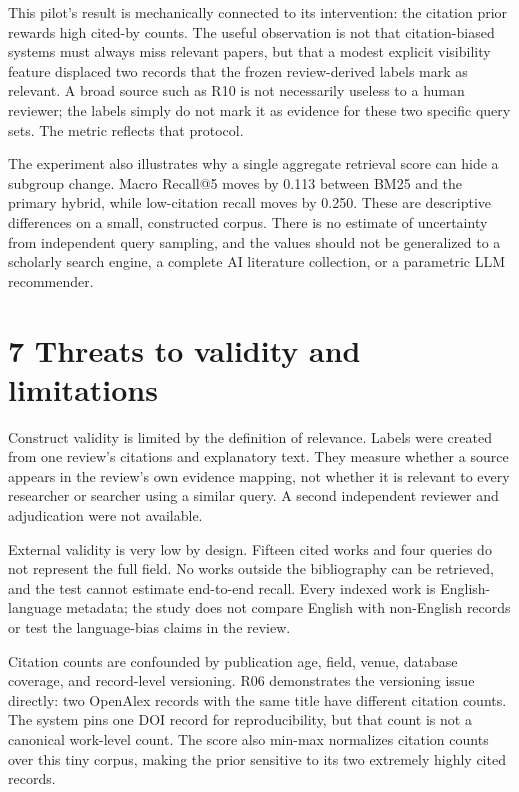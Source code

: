 \documentclass[acmsmall,nonacm]{acmart}
\begin{document}
This pilot's result is mechanically connected to its intervention: the citation prior rewards high cited-by counts. The useful observation is not that citation-biased systems must always miss relevant papers, but that a modest explicit visibility feature displaced two records that the frozen review-derived labels mark as relevant. A broad source such as R10 is not necessarily useless to a human reviewer; the labels simply do not mark it as evidence for these two specific query sets. The metric reflects that protocol.\par

The experiment also illustrates why a single aggregate retrieval score can hide a subgroup change. Macro Recall@5 moves by 0.113 between BM25 and the primary hybrid, while low-citation recall moves by 0.250. These are descriptive differences on a small, constructed corpus. There is no estimate of uncertainty from independent query sampling, and the values should not be generalized to a scholarly search engine, a complete AI literature collection, or a parametric LLM recommender.\par

\section*{7 Threats to validity and limitations}

Construct validity is limited by the definition of relevance. Labels were created from one review's citations and explanatory text. They measure whether a source appears in the review's own evidence mapping, not whether it is relevant to every researcher or searcher using a similar query. A second independent reviewer and adjudication were not available.\par

External validity is very low by design. Fifteen cited works and four queries do not represent the full field. No works outside the bibliography can be retrieved, and the test cannot estimate end-to-end recall. Every indexed work is English-language metadata; the study does not compare English with non-English records or test the language-bias claims in the review.\par

Citation counts are confounded by publication age, field, venue, database coverage, and record-level versioning. R06 demonstrates the versioning issue directly: two OpenAlex records with the same title have different citation counts. The system pins one DOI record for reproducibility, but that count is not a canonical work-level count. The score also min-max normalizes citation counts over this tiny corpus, making the prior sensitive to its two extremely highly cited records.\par
\end{document}
